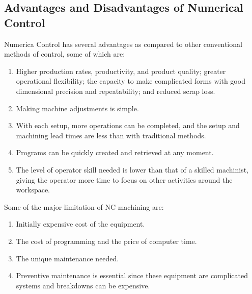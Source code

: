 \subsection{Advantages and Disadvantages of Numerical Control}
Numerica Control has several advantages as compared to other conventional methods of control\cite{Kalpakjian2010}, some of which are:
\begin{enumerate}
	\item Higher production rates, productivity, and product quality; greater operational flexibility; the capacity to make complicated forms with good dimensional precision and repeatability; and reduced scrap loss.
	\item Making machine adjustments is simple.
	\item With each setup, more operations can be completed, and the setup and machining lead times are less than with traditional methods.
	\item Programs can be quickly created and retrieved at any moment.
	\item The level of operator skill needed is lower than that of a skilled machinist, giving the operator more time to focus on other activities around the workspace.
\end{enumerate}
Some of the major limitation of NC machining are:
\begin{enumerate}
	\item Initially expensive cost of the equipment.
	\item The cost of programming and the price of computer time.
	\item The unique maintenance needed.
	\item Preventive maintenance is essential since these equipment are complicated systems and breakdowns can be expensive.
\end{enumerate}